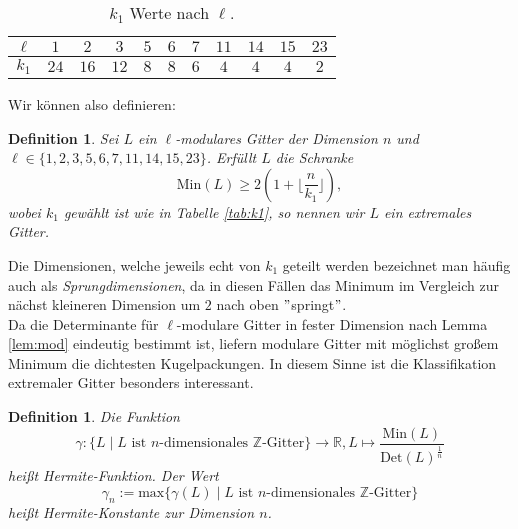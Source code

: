 \documentclass[12pt,a4paper,halfparskip,headsepline,bibtotocnumbered]{scrreprt}
\theoremstyle{nummermitklammern}
\newtheorem{definition}[defsatzusw]{Definition}
\theoremstyle{nonumberbreak}
\newcommand{\Z}{\mathbb{Z}}
\newcommand{\R}{\mathbb{R}}
\newcommand{\Det}{\text{Det}}
\newcommand{\Min}{\text{Min}}
\begin{document}
\begin{table}
	\centering
	\begin{tabular}{c|c|c|c|c|c|c|c|c|c|c}
		$\ell$	&$1$	&$2$	&$3$	&$5$	&$6$	&$7$	&$11$	&$14$	&$15$	&$23$\\
		\hline
		$k_1$		&$24$	&$16$	&$12$	&$8$	&$8$	&$6$	&$4$	&$4$	&$4$	&$2$
	\end{tabular}
	\caption{$k_1$ Werte nach $\ell$.\label{tab:k1}}
\end{table}

Wir können also definieren:

\begin{framed}
	\begin{definition}
		Sei $L$ ein $\ell$-modulares Gitter der Dimension $n$ und $\ell \in \lbrace 1,2,3,5,6,7,11,14,15,23 \rbrace$. Erfüllt $L$ die Schranke
		\begin{equation*}
			\Min(L) \geq 2 \left( 1 + \lfloor \frac{n}{k_1} \rfloor \right),
		\end{equation*}
		wobei $k_1$ gewählt ist wie in Tabelle \eqref{tab:k1}, so nennen wir $L$ ein \textit{extremales Gitter}.
	\end{definition}
\end{framed}

Die Dimensionen, welche jeweils echt von $k_1$ geteilt werden bezeichnet man häufig auch als \textit{Sprungdimensionen}, da in diesen Fällen das Minimum im Vergleich zur nächst kleineren Dimension um $2$ nach oben $"$springt$"$.\\
Da die Determinante für $\ell$-modulare Gitter in fester Dimension nach Lemma \eqref{lem:mod} eindeutig bestimmt ist, liefern modulare Gitter mit möglichst großem Minimum die dichtesten Kugelpackungen. In diesem Sinne ist die Klassifikation extremaler Gitter besonders interessant.

\begin{framed}
	\begin{definition}
		Die Funktion
		\begin{equation}
			\gamma : \lbrace L \mid L \text{ ist } n\text{-dimensionales } \Z \text{-Gitter} \rbrace \rightarrow \R, L \mapsto \frac{\Min(L)}{\Det(L)^\frac{1}{n}}
		\end{equation}
		heißt \textit{Hermite-Funktion}. Der Wert
		\begin{equation*}
			\gamma_n := \text{max} \lbrace \gamma(L) \mid L \text{ ist } n \text{-dimensionales } \Z\text{-Gitter} \rbrace
		\end{equation*}
		heißt \textit{Hermite-Konstante} zur Dimension $n$.
	\end{definition}
\end{framed} 
\end{document}
